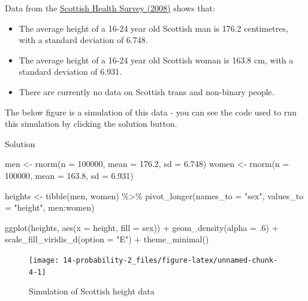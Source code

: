 \documentclass[
  oneside]{book}
\newenvironment{Shaded}{\begin{snugshade}}{\end{snugshade}}
\newcommand{\AttributeTok}[1]{\textcolor[rgb]{0.77,0.63,0.00}{#1}}
\newcommand{\DecValTok}[1]{\textcolor[rgb]{0.00,0.00,0.81}{#1}}
\newcommand{\FloatTok}[1]{\textcolor[rgb]{0.00,0.00,0.81}{#1}}
\newcommand{\FunctionTok}[1]{\textcolor[rgb]{0.00,0.00,0.00}{#1}}
\newcommand{\NormalTok}[1]{#1}
\newcommand{\OtherTok}[1]{\textcolor[rgb]{0.56,0.35,0.01}{#1}}
\newcommand{\SpecialCharTok}[1]{\textcolor[rgb]{0.00,0.00,0.00}{#1}}
\newcommand{\StringTok}[1]{\textcolor[rgb]{0.31,0.60,0.02}{#1}}
\providecommand{\tightlist}{%
  \setlength{\itemsep}{0pt}\setlength{\parskip}{0pt}}
\begin{document}
Data from the \href{http://www.scotland.gov.uk/Resource/Doc/286063/0087158.pdf}{Scottish Health Survey (2008)} shows that:

\begin{itemize}
\tightlist
\item
  The average height of a 16-24 year old Scottish man is 176.2 centimetres, with a standard deviation of 6.748.
\item
  The average height of a 16-24 year old Scottish woman is 163.8 cm, with a standard deviation of 6.931.
\item
  There are currently no data on Scottish trans and non-binary people.
\end{itemize}

The below figure is a simulation of this data - you can see the code used to run this simulation by clicking the solution button.

Solution

\begin{Shaded}
\begin{Highlighting}[]
\NormalTok{men }\OtherTok{\textless{}{-}} \FunctionTok{rnorm}\NormalTok{(}\AttributeTok{n =} \DecValTok{100000}\NormalTok{, }\AttributeTok{mean =} \FloatTok{176.2}\NormalTok{, }\AttributeTok{sd =} \FloatTok{6.748}\NormalTok{)}
\NormalTok{women }\OtherTok{\textless{}{-}} \FunctionTok{rnorm}\NormalTok{(}\AttributeTok{n =} \DecValTok{100000}\NormalTok{, }\AttributeTok{mean =} \FloatTok{163.8}\NormalTok{, }\AttributeTok{sd =} \FloatTok{6.931}\NormalTok{)}

\NormalTok{heights }\OtherTok{\textless{}{-}} \FunctionTok{tibble}\NormalTok{(men, women) }\SpecialCharTok{\%\textgreater{}\%}
  \FunctionTok{pivot\_longer}\NormalTok{(}\AttributeTok{names\_to =} \StringTok{"sex"}\NormalTok{, }\AttributeTok{values\_to =} \StringTok{"height"}\NormalTok{, men}\SpecialCharTok{:}\NormalTok{women)}

\FunctionTok{ggplot}\NormalTok{(heights, }\FunctionTok{aes}\NormalTok{(}\AttributeTok{x =}\NormalTok{ height, }\AttributeTok{fill =}\NormalTok{ sex)) }\SpecialCharTok{+}
  \FunctionTok{geom\_density}\NormalTok{(}\AttributeTok{alpha =}\NormalTok{ .}\DecValTok{6}\NormalTok{) }\SpecialCharTok{+}
  \FunctionTok{scale\_fill\_viridis\_d}\NormalTok{(}\AttributeTok{option =} \StringTok{"E"}\NormalTok{) }\SpecialCharTok{+}
  \FunctionTok{theme\_minimal}\NormalTok{()}
\end{Highlighting}
\end{Shaded}

\begin{figure}

{\centering \texttt{[image: 14-probability-2\_files/figure-latex/unnamed-chunk-4-1]} 

}

\caption{Simulation of Scottish height data}\label{fig:unnamed-chunk-4}
\end{figure}
\end{document}
